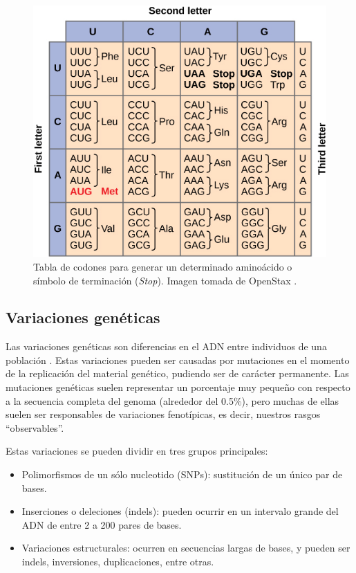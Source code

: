 \begin{figure}[H]
\centering
    \includegraphics[scale=0.8]{documents/latex/figures/1/tableCodon.jpg}
    \caption{Tabla de codones para generar un determinado aminoácido o símbolo de terminación (\textit{Stop}). Imagen tomada de OpenStax \cite{OpenStaxCNX}.}
    \label{fig:table_codon}
\end{figure}

\newpage

\subsection{Variaciones genéticas}

Las variaciones genéticas son diferencias en el ADN entre individuos de una población \cite{EMBL}. Estas variaciones pueden ser causadas por mutaciones en el momento de la replicación del material genético, pudiendo ser de carácter permanente. Las mutaciones genéticas suelen representar un porcentaje muy pequeño con respecto a la secuencia completa del genoma (alrededor del 0.5\%), pero muchas de ellas suelen ser responsables de variaciones fenotípicas, es decir, nuestros rasgos ``observables''. 

Estas variaciones se pueden dividir en tres grupos principales:

\begin{itemize}
    \item Polimorfismos de un sólo nucleotido (SNPs): sustitución de un único par de bases. 
    \item Inserciones o deleciones (indels): pueden ocurrir en un intervalo grande del ADN de entre 2 a 200 pares de bases.
    
    \item Variaciones estructurales: ocurren en secuencias largas de bases, y pueden ser indels, inversiones, duplicaciones, entre otras.
    
\end{itemize}

